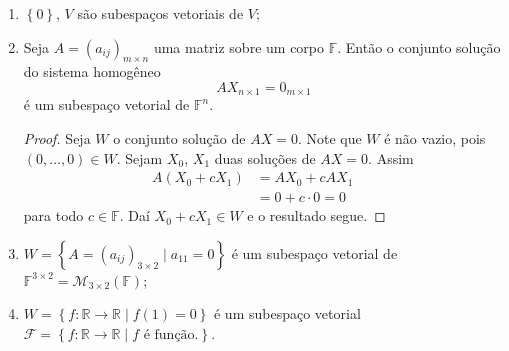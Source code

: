 \begin{example}
	\begin{enumerate}\leavevmode
		\item

		      $\left\{0\right\}$, $V$ são subespaços vetoriais de $V$;

		\item

		      Seja $A={\left(a_{ij}\right)}_{m\times n}$ uma matriz sobre um corpo $\mathbb{F}$. Então o conjunto solução do sistema homogêneo
		      \[
			      A
				      {X}_{n\times1}=
			      {0}_{m\times1}
		      \]
		      é um subespaço vetorial de $\mathbb{F}^{n}$.

		      \begin{proof}
			      Seja $W$ o conjunto solução de $AX=0$.
			      Note que $W$ é não vazio, pois $\left(0,\dotsc,0\right)\in W$.
			      Sejam $X_{0}$, $X_{1}$ duas soluções de $AX=0$.
			      Assim
			      \begin{align*}
				      A\left(X_{0}+cX_{1}\right)
				       & =AX_{0}+cAX_{1} &  & \\
				       & =0 + c\cdot 0=0 &  &
			      \end{align*}
			      para todo $c\in\mathbb{F}$.
			      Daí $X_{0}+cX_{1}\in W$ e o resultado segue.
		      \end{proof}

		\item

		      \begin{math}
			      W=
			      \left\{
			      A=
			      {\left(a_{ij}\right)}_{3\times2}
			      \mid a_{11}=0
			      \right\}
		      \end{math}
		      é um subespaço vetorial de $\mathbb{F}^{3\times2}=\mathcal{M}_{3\times2}\left(\mathbb{F}\right)$;

		\item

		      \begin{math}
			      W=
			      \left\{
			      f\colon
			      \mathbb{R}\to\mathbb{R}
			      \mid f\left(1\right)=0
			      \right\}
		      \end{math}
		      é um subespaço vetorial
		      \begin{math}
			      \mathcal{F}=
			      \left\{
			      f\colon
			      \mathbb{R}\to\mathbb{R}
			      \mid f\text{ é função.}
			      \right\}
		      \end{math}.
	\end{enumerate}
\end{example}


